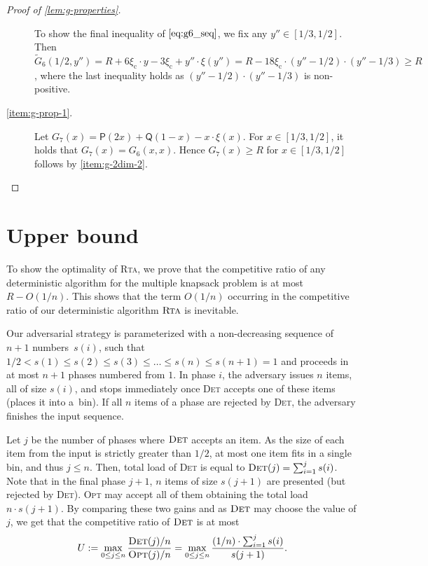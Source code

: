 \documentclass[a4paper,USenglish,cleveref]{lipics-v2019}
\newcommand{\R}{\ensuremath{R}}
\newcommand{\gconst}{\ensuremath{\xi_\mathrm{c}}}
\newcommand{\g}{\ensuremath{\xi}}
\newcommand{\water}{\textsf{Q}}
\newcommand{\cutintegral}{\textsf{P}}
\newcommand{\ALG}{\textsc{Rta}\xspace}
\newcommand{\OPT}{\textsc{Opt}\xspace}
\newcommand{\DET}{\textsc{Det}\xspace}
\begin{document}
\begin{proof}[Proof of \cref{lem:g-properties}]
\begin{description}
To show the final inequality of $\eqref{eq:g6_seq}$, 
we fix any $y'' \in [1/3,1/2]$. Then 
$\tilde{G}_6(1/2,y'') 
  = \R + 6 \gconst \cdot y - 3 \gconst + y'' \cdot \g(y'') 
  = \R - 18 \gconst \cdot (y'' - 1/2) \cdot (y''-1/3) 
  \geq \R$,
where the last inequality holds as $(y'' - 1/2) \cdot (y''-1/3)$ is non-positive.

\item[\cref{item:g-prop-1}.]
Let $G_7(x) = \cutintegral(2 x) + \water(1-x) - x \cdot \g(x)$. 
For $x \in [1/3,1/2]$, it holds that $G_7(x) = G_6(x,x)$.
Hence $G_7(x) \geq \R$ for $x \in [1/3,1/2]$ follows by \cref{item:g-2dim-2}.
\qedhere
\end{description}
\end{proof}



\section{Upper bound}
\label{sec:upper}

To show the optimality of \ALG, we prove that the competitive ratio of any
deterministic algorithm for the multiple knapsack problem is at most $\R -
O(1/n)$. This shows that the term $O(1/n)$ occurring in the competitive
ratio of our deterministic algorithm $\ALG$ is inevitable.

Our adversarial strategy is parameterized with a non-decreasing sequence of $n +
1$ numbers~$s(i)$, such that $1/2 < s(1) \leq s(2) \leq s(3) \leq \ldots \leq
s(n) \leq s(n+1) = 1$ and proceeds in at most $n+1$ phases numbered from $1$. In
phase $i$, the adversary issues $n$ items, all of size $s(i)$, and stops
immediately once \DET accepts one of these items (places it into a~bin). If all
$n$ items of a phase are rejected by \DET, the adversary finishes the input
sequence. 

Let $j$ be the number of phases where $\DET$ accepts an item. As the size of
each item from the input is strictly greater than $1/2$, at most one item fits
in a single bin, and thus $j \leq n$. Then, total load of \DET is equal to
$\DET(j) = \sum_{i = 1}^{j} s(i)$. Note that in the final phase $j+1$, $n$ items
of size $s(j+1)$ are presented (but rejected by \DET). \OPT may accept all of
them obtaining the total load $n \cdot s(j+1)$. By comparing these two gains and
as $\DET$ may choose the value of $j$, we get that the competitive ratio of
$\DET$ is at most
\begin{equation}
\label{eq:upper-bound-ratio}
U := \max_{0 \leq j \leq n} \frac{\DET(j) / n}{\OPT(j) / n} = 
  \max_{0 \leq j \leq n} \frac{ (1/n) \cdot \sum_{i = 1}^{j} s(i)}{s(j+1)}.
\end{equation}
\end{document}
